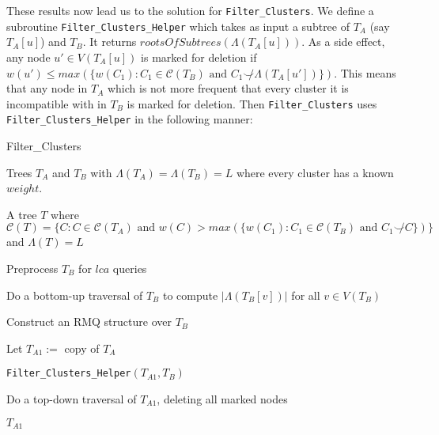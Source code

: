 \documentclass{article}
\newcommand{\compatible}{\smile}
\newcommand{\leafset}{\Lambda}
\begin{document}
    These results now lead us to the solution for \texttt{Filter\_Clusters}. We define a subroutine \texttt{Filter\_Clusters\_Helper} which takes as input a subtree of $T_A$ (say $T_A[u]$) and $T_B$. It returns $rootsOfSubtrees(\leafset(T_A[u]))$. As a side effect, any node $u' \in V(T_A[u])$ is marked for deletion if $w(u') \leq max(\{w(C_1) : C_1 \in \mathcal{C}(T_B) \text{ and } C_1 \not\compatible \leafset(T_A[u'])\})$. This means that any node in $T_A$ which is not more frequent that every cluster it is incompatible with in $T_B$ is marked for deletion. Then \texttt{Filter\_Clusters} uses \texttt{Filter\_Clusters\_Helper} in the following manner:

    \begin{algorithm}
        \caption{Filter\_Clusters}
        \begin{algorithmic}[1]
            \Input Trees $T_A$ and $T_B$ with $\leafset(T_A) = \leafset(T_B) = L$ where every cluster has a known $weight$.

            \Output A tree $T$ where $\mathcal{C}(T) = \{C : C \in \mathcal{C}(T_A) \text{ and } w(C) > max(\{w(C_1) : C_1 \in \mathcal{C}(T_B) \text{ and } C_1 \not\compatible C\})\}$ and $\leafset(T) = L$

            \State Preprocess $T_B$ for $lca$ queries

            \State Do a bottom-up traversal of $T_B$ to compute $|\leafset(T_B[v])|$ for all $v \in V(T_B)$

            \State Construct an RMQ structure over $T_B$

            \State Let $T_{A1} :=$ copy of $T_A$

            \State \texttt{Filter\_Clusters\_Helper}$(T_{A1}, T_B)$

            \State Do a top-down traversal of $T_{A1}$, deleting all marked nodes

            \State \Return $T_{A1}$
        \end{algorithmic}
    \end{algorithm}
\end{document}
